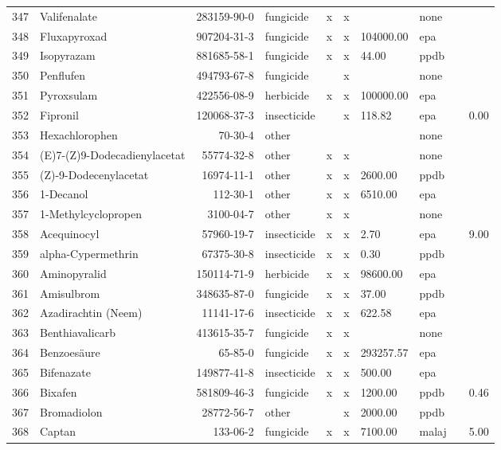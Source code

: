 \begin{longtable}{lp{3cm}rlp{0.5cm}p{0.5cm}p{1cm}p{1cm}p{1cm}p{1cm}}
  347 & Valifenalate & 283159-90-0 & fungicide & x & x &  & none &  &  \\ 
  348 & Fluxapyroxad & 907204-31-3 & fungicide & x & x & 104000.00 & epa &  &  \\ 
  349 & Isopyrazam & 881685-58-1 & fungicide & x & x & 44.00 & ppdb &  &  \\ 
  350 & Penflufen & 494793-67-8 & fungicide &  & x &  & none &  &  \\ 
  351 & Pyroxsulam & 422556-08-9 & herbicide & x & x & 100000.00 & epa &  &  \\ 
  352 & Fipronil & 120068-37-3 & insecticide &  & x & 118.82 & epa &  & 0.00 \\ 
  353 & Hexachlorophen & 70-30-4 & other &  &  &  & none &  &  \\ 
  354 & (E)7-(Z)9-Dodecadienylacetat & 55774-32-8 & other & x & x &  & none &  &  \\ 
  355 & (Z)-9-Dodecenylacetat & 16974-11-1 & other & x & x & 2600.00 & ppdb &  &  \\ 
  356 & 1-Decanol & 112-30-1 & other & x & x & 6510.00 & epa &  &  \\ 
  357 & 1-Methylcyclopropen & 3100-04-7 & other & x & x &  & none &  &  \\ 
  358 & Acequinocyl & 57960-19-7 & insecticide & x & x & 2.70 & epa &  & 9.00 \\ 
  359 & alpha-Cypermethrin & 67375-30-8 & insecticide & x & x & 0.30 & ppdb &  &  \\ 
  360 & Aminopyralid & 150114-71-9 & herbicide & x & x & 98600.00 & epa &  &  \\ 
  361 & Amisulbrom & 348635-87-0 & fungicide & x & x & 37.00 & ppdb &  &  \\ 
  362 & Azadirachtin (Neem) & 11141-17-6 & insecticide & x & x & 622.58 & epa &  &  \\ 
  363 & Benthiavalicarb & 413615-35-7 & fungicide & x & x &  & none &  &  \\ 
  364 & Benzoesäure & 65-85-0 & fungicide & x & x & 293257.57 & epa &  &  \\ 
  365 & Bifenazate & 149877-41-8 & insecticide & x & x & 500.00 & epa &  &  \\ 
  366 & Bixafen & 581809-46-3 & fungicide & x & x & 1200.00 & ppdb &  & 0.46 \\ 
  367 & Bromadiolon & 28772-56-7 & other &  & x & 2000.00 & ppdb &  &  \\ 
  368 & Captan & 133-06-2 & fungicide & x & x & 7100.00 & malaj &  & 5.00 \\ 

\end{longtable}
